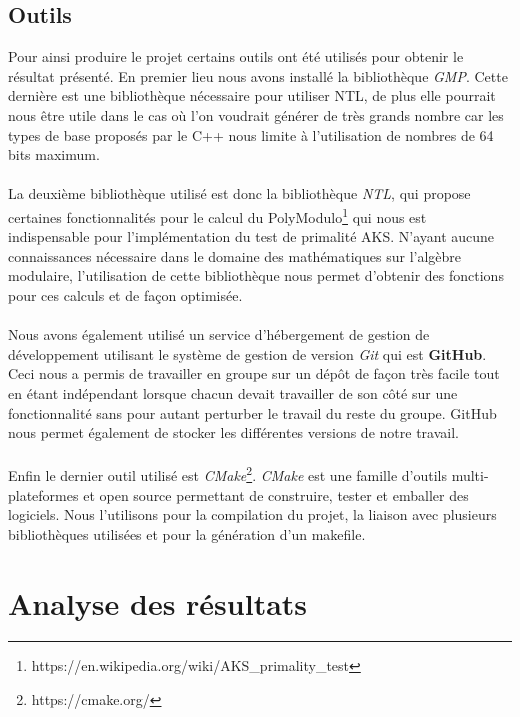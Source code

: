 		\subsection{Outils}
		Pour ainsi produire le projet certains outils ont été utilisés pour obtenir le résultat présenté. En premier lieu nous avons installé la bibliothèque \textit{GMP}. Cette dernière est une bibliothèque nécessaire pour utiliser NTL, de plus elle pourrait nous être utile dans le cas où l'on voudrait générer de très grands nombre car les types de base proposés par le C++ nous limite à l'utilisation de nombres de 64 bits maximum.
		\paragraph{}La deuxième bibliothèque utilisé est donc la bibliothèque \textit{NTL}, qui propose certaines fonctionnalités pour le calcul du PolyModulo\footnote{https://en.wikipedia.org/wiki/AKS\_primality\_test} qui nous est indispensable pour l'implémentation du test de primalité AKS. N'ayant aucune connaissances nécessaire dans le domaine des mathématiques sur l'algèbre modulaire, l'utilisation de cette bibliothèque nous permet d'obtenir des fonctions pour ces calculs et de façon optimisée.  
		\paragraph{}Nous avons également utilisé un service d’hébergement de gestion de développement utilisant le système de gestion de version \textit{Git} qui est \textbf{GitHub}. Ceci nous a permis de travailler en groupe sur un dépôt de façon très facile tout en étant indépendant lorsque chacun devait travailler de son côté sur une fonctionnalité sans pour autant perturber le travail du reste du groupe. GitHub nous permet également de stocker les différentes versions de notre travail.   
		\paragraph{}Enfin le dernier outil utilisé est \textit{CMake}\footnote{https://cmake.org/}. \textit{CMake} est une famille d'outils multi-plateformes et open source permettant de construire, tester et emballer des logiciels. Nous l'utilisons pour la compilation du projet, la liaison avec plusieurs bibliothèques utilisées et pour la génération d'un makefile. 
			
	\section{Analyse des résultats}
